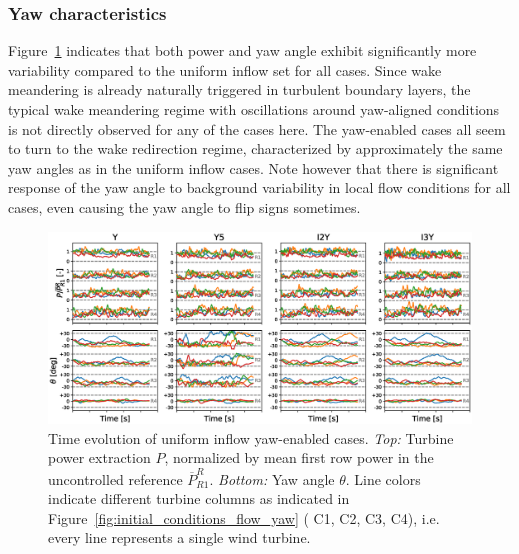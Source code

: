 \documentclass[energies,article,submit,moreauthors,latex,10pt,a4paper]{mdpi}
\begin{document}
\subsubsection{Yaw characteristics}\label{subsec:turb_yaw}
\noindent Figure~\ref{fig:dynamic_turb} indicates that both power and yaw angle exhibit significantly more variability compared to the uniform inflow set for all cases. Since wake meandering is already naturally triggered in turbulent boundary layers, the typical wake meandering regime with oscillations around yaw-aligned conditions is not directly observed for any of the cases here. The yaw-enabled cases all seem to turn to the wake redirection regime, characterized by approximately the same yaw angles as in the uniform inflow cases. Note however that there is significant response of the yaw angle to background variability in local flow conditions for all cases, even causing the yaw angle to flip signs sometimes. 
\begin{figure}
	\includegraphics[width=\textwidth]{figure13}	
	\caption{Time evolution of uniform inflow yaw-enabled cases. \emph{Top: } Turbine power extraction $P$, normalized by mean first row power in the uncontrolled reference $\overline{P}_{R1}^R$. \emph{Bottom: } Yaw angle $\theta$. Line colors indicate different turbine columns as indicated in Figure~\ref{fig:initial_conditions_flow_yaw} ({\color{C1} C1}, {\color{C2} C2}, {\color{C3} C3}, {\color{C4} C4}), i.e. every line represents a single wind turbine. \label{fig:dynamic_turb}}
\end{figure}
\end{document}
